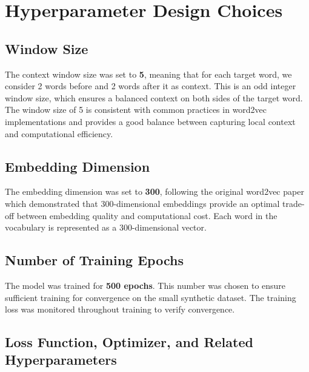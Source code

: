 \documentclass[11pt]{article}
\begin{document}
\section{Hyperparameter Design Choices}

\subsection{Window Size}

The context window size was set to \textbf{5}, meaning that for each target word, we consider 2 words before and 2 words after it as context. This is an odd integer window size, which ensures a balanced context on both sides of the target word. The window size of 5 is consistent with common practices in word2vec implementations and provides a good balance between capturing local context and computational efficiency.

\subsection{Embedding Dimension}

The embedding dimension was set to \textbf{300}, following the original word2vec paper which demonstrated that 300-dimensional embeddings provide an optimal trade-off between embedding quality and computational cost. Each word in the vocabulary is represented as a 300-dimensional vector.

\subsection{Number of Training Epochs}

The model was trained for \textbf{500 epochs}. This number was chosen to ensure sufficient training for convergence on the small synthetic dataset. The training loss was monitored throughout training to verify convergence.

\subsection{Loss Function, Optimizer, and Related Hyperparameters}
\end{document}
